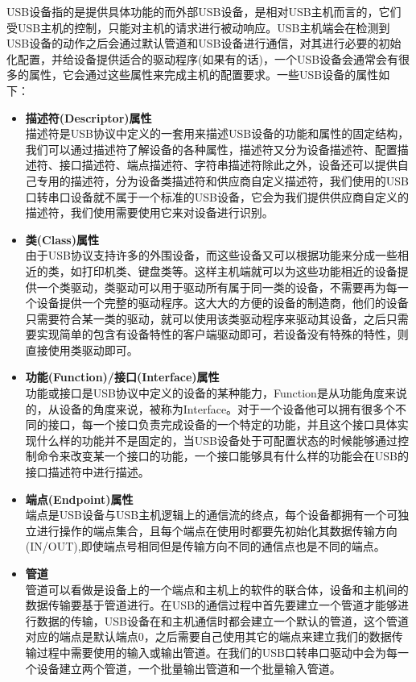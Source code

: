 	USB设备指的是提供具体功能的而外部USB设备，是相对USB主机而言的，它们受USB主机的控制，只能对主机的请求进行被动响应。USB主机端会在检测到USB设备的动作之后会通过默认管道和USB设备进行通信，对其进行必要的初始化配置，并给设备提供适合的驱动程序(如果有的话)，一个USB设备会通常会有很多的属性，它会通过这些属性来完成主机的配置要求。一些USB设备的属性如下：
	\begin{itemize}
	\item \textbf{描述符(Descriptor)属性}\\
	描述符是USB协议中定义的一套用来描述USB设备的功能和属性的固定结构，我们可以通过描述符了解设备的各种属性，描述符又分为设备描述符、配置描述符、接口描述符、端点描述符、字符串描述符\cite{张杰2008基于}\cite{边海龙2004USB}除此之外，设备还可以提供自己专用的描述符，分为设备类描述符和供应商自定义描述符，我们使用的USB口转串口设备就不属于一个标准的USB设备，它会为我们提供供应商自定义的描述符，我们使用需要使用它来对设备进行识别。
	
	\item \textbf{类(Class)属性}\\
	由于USB协议支持许多的外围设备，而这些设备又可以根据功能来分成一些相近的类，如打印机类、键盘类等。这样主机端就可以为这些功能相近的设备提供一个类驱动，类驱动可以用于驱动所有属于同一类的设备，不需要再为每一个设备提供一个完整的驱动程序。这大大的方便的设备的制造商，他们的设备只需要符合某一类的驱动，就可以使用该类驱动程序来驱动其设备，之后只需要实现简单的包含有设备特性的客户端驱动即可，若设备没有特殊的特性，则直接使用类驱动即可\cite{李雪红2004USB}。	
	
	\item \textbf{功能(Function)/接口(Interface)属性}\\
	功能或接口是USB协议中定义的设备的某种能力，Function是从功能角度来说的，从设备的角度来说，被称为Interface。对于一个设备他可以拥有很多个不同的接口，每一个接口负责完成设备的一个特定的功能，并且这个接口具体实现什么样的功能并不是固定的，当USB设备处于可配置状态的时候能够通过控制命令来改变某一个接口的功能，一个接口能够具有什么样的功能会在USB的接口描述符中进行描述。
	
	\item \textbf{端点(Endpoint)属性}\\
	端点是USB设备与USB主机逻辑上的通信流的终点，每个设备都拥有一个可独立进行操作的端点集合，且每个端点在使用时都要先初始化其数据传输方向(IN/OUT),即使端点号相同但是传输方向不同的通信点也是不同的端点\cite{李雪红2004USB}。
	
	\item \textbf{管道}\\
	管道可以看做是设备上的一个端点和主机上的软件的联合体，设备和主机间的数据传输要基于管道进行。在USB的通信过程中首先要建立一个管道才能够进行数据的传输，USB设备在和主机通信时都会建立一个默认的管道，这个管道对应的端点是默认端点0，之后需要自己使用其它的端点来建立我们的数据传输过程中需要使用的输入或输出管道。在我们的USB口转串口驱动中会为每一个设备建立两个管道，一个批量输出管道和一个批量输入管道。
	

\end{itemize}
